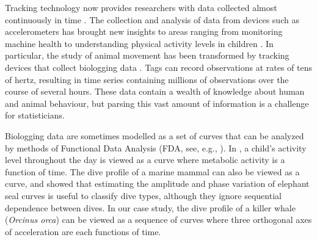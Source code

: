 Tracking technology now provides researchers with data collected almost continuously in time \citep{Hooten:2017}.
The collection and analysis of data from devices such as accelerometers has brought new insights to areas ranging from monitoring machine health \citep{Getman:2009} to understanding physical activity levels in children \citep{Morris:2007}. In particular, the study of animal movement has been transformed by tracking devices that collect biologging data \citep{Borger:2020}. Tags can record observations at rates of tens of hertz, resulting in time series containing millions of observations over the course of several hours. These data contain a wealth of knowledge about human and animal behaviour, but parsing this vast amount of information is a challenge for statisticians.


Biologging data are sometimes modelled as a set of curves that can be analyzed by methods of Functional Data Analysis (FDA, see, e.g., \citealt{Ramsay:2005}). In \cite{Morris:2007}, a child's activity level throughout the day is viewed as a curve where metabolic activity is a function of time. The dive profile of a marine mammal can also be viewed as a curve, and \citet{Fu:2017} showed that estimating the amplitude and phase variation of elephant seal curves is useful to classify dive types, although they ignore sequential dependence between dives. 
In our case study, the dive profile of a killer whale (\textit{Orcinus orca}) can be viewed as a sequence of curves where three orthogonal axes of acceleration are each functions of time.


